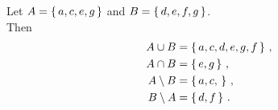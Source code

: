 \guard





\begin{exmp}
\label{exmp:setOperations}
  Let $A=\left\{\,a,c,e,g\,\right\}$ and $B=\left\{\,d,e,f,g\,\right\}$.\\
  Then
  \begin{align*}
    A\cup B &= \left\{\, a,c,d,e,g,f\,\right\}\,, \\
    A\cap B &= \left\{\, e, g\,\right\}\,, \\
    A\setminus B &= \left\{\, a, c, \,\right\}\,, \\
    B\setminus A &= \left\{\, d, f \,\right\}\,.
  \end{align*}

\end{exmp}
